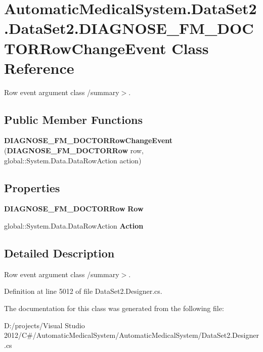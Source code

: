 \section{AutomaticMedicalSystem.DataSet2.DataSet2.DIAGNOSE\_\-FM\_\-DOCTORRowChangeEvent Class Reference}
\label{class_automatic_medical_system_1_1_data_set2_1_1_d_i_a_g_n_o_s_e___f_m___d_o_c_t_o_r_row_change_event}
Row event argument class /summary$>$.  


\subsection*{Public Member Functions}
\begin{CompactItemize}
\item 
\textbf{DIAGNOSE\_\-FM\_\-DOCTORRowChangeEvent} ({\bf DIAGNOSE\_\-FM\_\-DOCTORRow} row, global::System.Data.DataRowAction action)\label{class_automatic_medical_system_1_1_data_set2_1_1_d_i_a_g_n_o_s_e___f_m___d_o_c_t_o_r_row_change_event_6305abca3529eb191e7dea09ce1045ba}

\end{CompactItemize}
\subsection*{Properties}
\begin{CompactItemize}
\item 
{\bf DIAGNOSE\_\-FM\_\-DOCTORRow} \textbf{Row}\hspace{0.3cm}{\tt  [get]}\label{class_automatic_medical_system_1_1_data_set2_1_1_d_i_a_g_n_o_s_e___f_m___d_o_c_t_o_r_row_change_event_b426f5088f462681de553136701247d5}

\item 
global::System.Data.DataRowAction \textbf{Action}\hspace{0.3cm}{\tt  [get]}\label{class_automatic_medical_system_1_1_data_set2_1_1_d_i_a_g_n_o_s_e___f_m___d_o_c_t_o_r_row_change_event_c3115230c5d854ea5f02456aba004a31}

\end{CompactItemize}


\subsection{Detailed Description}
Row event argument class /summary$>$. 

Definition at line 5012 of file DataSet2.Designer.cs.

The documentation for this class was generated from the following file:\begin{CompactItemize}
\item 
D:/projects/Visual Studio 2012/C\#/AutomaticMedicalSystem/AutomaticMedicalSystem/DataSet2.Designer.cs\end{CompactItemize}
